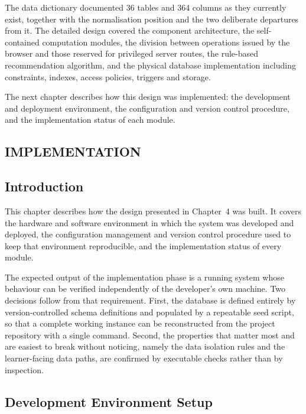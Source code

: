 \documentclass[12pt, oneside]{article} %
\begin{document}
The data dictionary documented 36 tables and 364 columns as they currently exist, together with the normalisation position and the two deliberate departures from it. The detailed design covered the component architecture, the self-contained computation modules, the division between operations issued by the browser and those reserved for privileged server routes, the rule-based recommendation algorithm, and the physical database implementation including constraints, indexes, access policies, triggers and storage.

The next chapter describes how this design was implemented: the development and deployment environment, the configuration and version control procedure, and the implementation status of each module.


\newpage
\vfill \null
\thispagestyle{empty}
\begin{center}
\section{IMPLEMENTATION}
\end{center}
\vspace{2cm}

\subsection{Introduction}

This chapter describes how the design presented in Chapter~4 was built. It covers the hardware and software environment in which the system was developed and deployed, the configuration management and version control procedure used to keep that environment reproducible, and the implementation status of every module.

The expected output of the implementation phase is a running system whose behaviour can be verified independently of the developer's own machine. Two decisions follow from that requirement. First, the database is defined entirely by version-controlled schema definitions and populated by a repeatable seed script, so that a complete working instance can be reconstructed from the project repository with a single command. Second, the properties that matter most and are easiest to break without noticing, namely the data isolation rules and the learner-facing data paths, are confirmed by executable checks rather than by inspection.

\subsection{Development Environment Setup}
\label{sec:impl-env}
\end{document}
